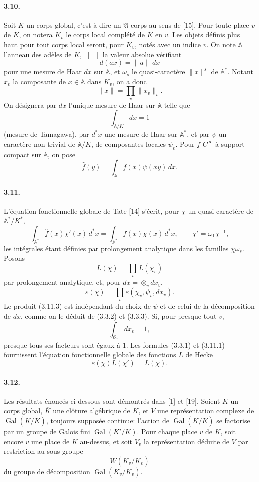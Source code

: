 \documentclass[10pt,letterpaper]{article}
\newcommand{\Gal}{\operatorname{Gal}}
\providecommand{\Gal}{\operatorname{Gal}}
\providecommand{\Gal}{\operatorname{Gal}}
\providecommand{\Gal}{\operatorname{Gal}}
\providecommand{\Gal}{\operatorname{Gal}}
\begin{document}
\paragraph{3.10.} Soit \(K\) un corps global, c'est-à-dire un \(\mathfrak A\)-corps au sens de [15]. Pour toute place \(v\) de \(K\), on notera \(K_v\) le corps local complété de \(K\) en \(v\). Les objets définis plus haut pour tout corps local seront, pour \(K_v\), notés avec un indice \(v\). On note \(\mathbb A\) l'anneau des adèles de \(K\), \(\|\ \|\) la valeur absolue vérifiant
\[
d(ax)=\|a\|\,dx
\]
pour une mesure de Haar \(dx\) sur \(\mathbb A\), et \(\omega_s\) le quasi-caractère \(\|x\|^s\) de \(\mathbb A^*\). Notant \(x_v\) la composante de \(x\in\mathbb A\) dans \(K_v\), on a donc
\[
\|x\|=\prod_v\|x_v\|_v.
\]
On désignera par \(dx\) l'unique mesure de Haar sur \(\mathbb A\) telle que
\[
\int_{\mathbb A/K}dx=1
\]
(mesure de Tamagawa), par \(d^*x\) une mesure de Haar sur \(\mathbb A^*\), et par \(\psi\) un caractère non trivial de \(\mathbb A/K\), de composantes locales \(\psi_v\). Pour \(f\) \(C^\infty\) à support compact sur \(\mathbb A\), on pose
\[
\widehat f(y)=\int_{\mathbb A}f(x)\psi(xy)\,dx.
\]



\paragraph{3.11.} L'équation fonctionnelle globale de Tate [14] s'écrit, pour \(\chi\) un quasi-caractère de \(\mathbb A^*/K^*\),
\[
\tag{3.11.1}
\int_{\mathbb A^*}\widehat f(x)\chi'(x)\,d^*x
=
\int_{\mathbb A^*}f(x)\chi(x)\,d^*x,
\qquad
\chi'=\omega_1\chi^{-1},
\]
les intégrales étant définies par prolongement analytique dans les familles \(\chi\omega_s\). Posons
\[
\tag{3.11.2}
L(\chi)=\prod_v L(\chi_v)
\]
par prolongement analytique, et, pour \(dx=\otimes_v dx_v\),
\[
\tag{3.11.3}
\varepsilon(\chi)=\prod_v\varepsilon(\chi_v,\psi_v,dx_v).
\]
Le produit (3.11.3) est indépendant du choix de \(\psi\) et de celui de la décomposition de \(dx\), comme on le déduit de (3.3.2) et (3.3.3). Si, pour presque tout \(v\),
\[
\int_{\mathcal O_v}dx_v=1,
\]
presque tous ses facteurs sont égaux à \(1\). Les formules (3.3.1) et (3.11.1) fournissent l'équation fonctionnelle globale des fonctions \(L\) de Hecke
\[
\tag{3.11.4}
\varepsilon(\chi)L(\chi')=L(\chi).
\]



\paragraph{3.12.} Les résultats énoncés ci-dessous sont démontrés dans [1] et [19]. Soient \(K\) un corps global, \(\overline K\) une clôture algébrique de \(K\), et \(V\) une représentation complexe de \(\Gal(\overline K/K)\), toujours supposée continue: l'action de \(\Gal(\overline K/K)\) se factorise par un groupe de Galois fini \(\Gal(K'/K)\). Pour chaque place \(v\) de \(K\), soit encore \(v\) une place de \(\overline K\) au-dessus, et soit \(V_v\) la représentation déduite de \(V\) par restriction au sous-groupe
\[
W(\overline K_v/K_v)
\]
du groupe de décomposition \(\Gal(\overline K_v/K_v)\).
\end{document}
